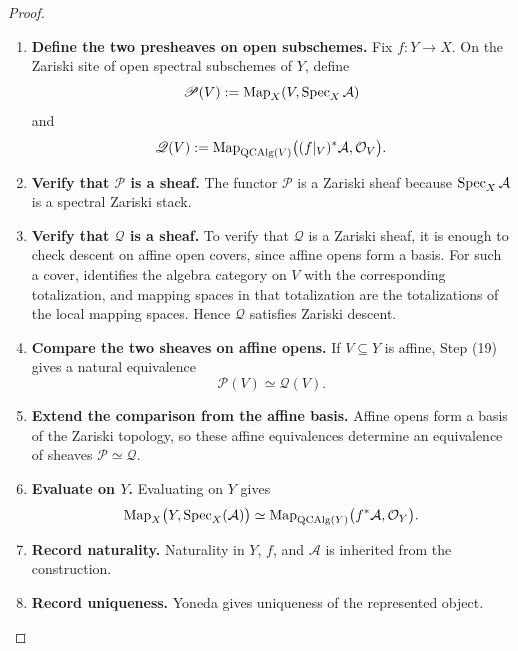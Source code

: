 \begin{proof}
\begin{enumerate}[label=\textup{(\arabic*)}]
    \item \textbf{Define the two presheaves on open subschemes.}
    Fix \(f:Y\to X\). On the Zariski site of open spectral subschemes of
    \(Y\), define
    \[
        \mathscr P(V)
        :=
        \operatorname{Map}_X(V,\operatorname{Spec}_X\mathcal A)
    \]
    and
    \[
        \mathscr Q(V)
        :=
        \operatorname{Map}_{\operatorname{QCAlg}(V)}
        \bigl((f|_V)^*\mathcal A,\mathcal O_V\bigr).
    \]

    \item \textbf{Verify that \(\mathscr P\) is a sheaf.}
    The functor \(\mathscr P\) is a Zariski sheaf because
    \(\operatorname{Spec}_X\mathcal A\) is a spectral Zariski stack.

    \item \textbf{Verify that \(\mathscr Q\) is a sheaf.}
    To verify that
    \(\mathscr Q\) is a Zariski sheaf, it is enough to
    check descent on affine open covers, since affine opens form a basis.
    For such a cover,  identifies the algebra
    category on \(V\) with the corresponding totalization, and mapping spaces
    in that totalization are the totalizations of the local mapping spaces.
    Hence \(\mathscr Q\) satisfies Zariski descent.

    \item \textbf{Compare the two sheaves on affine opens.}
    If \(V\subseteq Y\) is affine, Step \textup{(19)} gives a natural
    equivalence
    \[
        \mathscr P(V)\simeq\mathscr Q(V).
    \]

    \item \textbf{Extend the comparison from the affine basis.}
    Affine opens form a basis of the Zariski topology, so these affine
    equivalences determine an equivalence of sheaves
    \(\mathscr P\simeq\mathscr Q\).

    \item \textbf{Evaluate on \(Y\).}
    Evaluating on \(Y\) gives
    \[
        \operatorname{Map}_X\bigl(Y,\operatorname{Spec}_X(\mathcal A)\bigr)
        \simeq
        \operatorname{Map}_{\operatorname{QCAlg}(Y)}
        \bigl(f^*\mathcal A,\mathcal O_Y\bigr).
    \]

    \item \textbf{Record naturality.}
    Naturality in \(Y\), \(f\), and \(\mathcal A\) is inherited from the
    construction.

    \item \textbf{Record uniqueness.}
    Yoneda gives uniqueness of the represented object.
\end{enumerate}
\end{proof}

